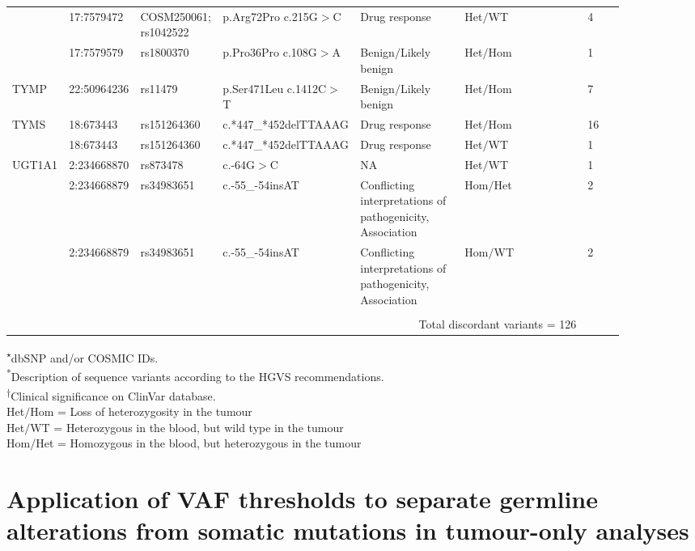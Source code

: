 \begin{landscape}
\begin{longtable}{p{0.09\linewidth}|p{0.1\linewidth}p{0.12\linewidth}p{0.14\linewidth}p{0.17\linewidth}p{0.2\linewidth}p{0.06\linewidth}}
		& 17:7579472 & COSM250061; rs1042522 & p.Arg72Pro c.215G$>$C & Drug response & Het$/$WT & 4
		\\
		& 17:7579579 & rs1800370 & p.Pro36Pro c.108G$>$A & Benign$/$Likely benign & Het$/$Hom & 1
		\\
		\hline
		TYMP & 22:50964236 & rs11479 & p.Ser471Leu c.1412C$>$T & Benign$/$Likely benign & Het$/$Hom & 7
		\\
		\hline
		TYMS & 18:673443 & rs151264360 & \footnotesize{c.*447\_*452delTTAAAG} & Drug response & Het$/$Hom & 16
		\\
		& 18:673443 & rs151264360 & \footnotesize{c.*447\_*452delTTAAAG} & Drug response & Het$/$WT & 1
		\\
		\hline
		UGT1A1 & 2:234668870 & rs873478 & c.-64G$>$C & NA & Het$/$WT & 1
		\\
		& 2:234668879 & rs34983651 & c.-55\_-54insAT & Conflicting interpretations of pathogenicity, Association & Hom$/$Het & 2
		\\
		& 2:234668879 & rs34983651 & c.-55\_-54insAT & Conflicting interpretations of pathogenicity, Association & Hom$/$WT & 2
		\\
		\hline
		\\
		&
		\multicolumn{5}{r}{Total discordant variants = 126}
		&
		\\
		\hline
\end{longtable}

\noindent\textsuperscript{$\star$}dbSNP and/or COSMIC IDs.
\\
\textsuperscript{*}Description of sequence variants according to the HGVS recommendations.
\\
\textsuperscript{$\dagger$}Clinical significance on ClinVar database.
\\
Het$/$Hom = Loss of heterozygosity in the tumour
\\
Het$/$WT = Heterozygous in the blood, but wild type in the tumour
\\
Hom$/$Het = Homozygous in the blood, but heterozygous in the tumour

\end{landscape}

\section{Application of VAF thresholds to separate germline alterations from somatic mutations in tumour-only analyses}
\label{sec:ApplicationofVAFthresholdstoseparategermlinealterationsfromsomaticmutationsintumour-onlyanalyses}

